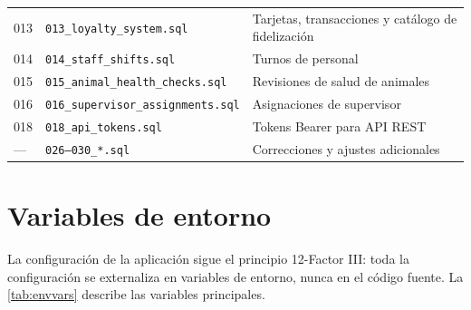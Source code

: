 \documentclass[12pt,a4paper,twoside,openright]{report}
\begin{document}
\begin{appendices}
\begin{longtable}{@{}llp{7cm}@{}}
  013 & \texttt{013\_loyalty\_system.sql}       & Tarjetas, transacciones y catálogo de fidelización\\
  014 & \texttt{014\_staff\_shifts.sql}         & Turnos de personal\\
  015 & \texttt{015\_animal\_health\_checks.sql}& Revisiones de salud de animales\\
  016 & \texttt{016\_supervisor\_assignments.sql}& Asignaciones de supervisor\\
  018 & \texttt{018\_api\_tokens.sql}           & Tokens Bearer para API REST\\
  —   & \texttt{026--030\_*.sql}                & Correcciones y ajustes adicionales\\
\end{longtable}

\chapter{Variables de entorno}
\label{ap:env}

La configuración de la aplicación sigue el principio 12-Factor III: toda la
configuración se externaliza en variables de entorno, nunca en el código fuente.
La \cref{tab:envvars} describe las variables principales.


\end{appendices}
\end{document}
